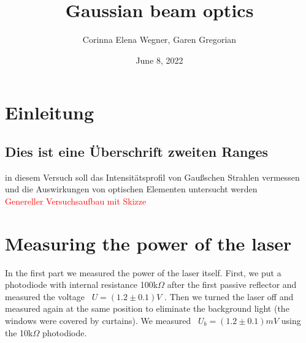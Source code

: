 \documentclass{article}
\begin{document}
 

\begin{titlepage}
\title{Gaussian beam optics}
\author{Corinna Elena Wegner, Garen Gregorian}
\date{June 8, 2022}
\maketitle %
\end{titlepage}

\newpage
\tableofcontents
\newpage

\section{Einleitung} %
\subsection{Dies ist eine Überschrift zweiten Ranges}

in diesem Versuch soll das Intensitätsprofil von Gaußschen Strahlen vermessen und die Auswirkungen von optischen Elementen untersucht werden\\

\textcolor{red}{Genereller Versuchsaufbau mit Skizze}\\

\section{Measuring the power of the laser}

In the first part we measured the power of the laser itself. First, we put a photodiode with internal resistance 100k$\Omega$
after the first passive reflector and measured the voltage
\ $U=(1.2 \pm 0.1) V$ %
. Then we turned the laser off and measured again at the same position to eliminate the background light (the windows were covered by curtains). We measured 
\ $U_b = (1.2 \pm 0.1)mV$ 
using the 
10k$\Omega$
photodiode. 
\end{document}
